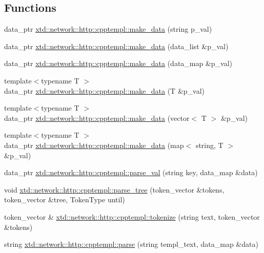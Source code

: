 \subsection*{Functions}
\begin{DoxyCompactItemize}
\item 
data\+\_\+ptr \hyperlink{namespacextd_1_1network_1_1http_1_1cpptempl_a32fe5ec0914372b09492647a168dbbcb}{xtd\+::network\+::http\+::cpptempl\+::make\+\_\+data} (string p\+\_\+val)
\item 
data\+\_\+ptr \hyperlink{namespacextd_1_1network_1_1http_1_1cpptempl_aae0780ff5e5b2afd5996fb6d27ff8ca0}{xtd\+::network\+::http\+::cpptempl\+::make\+\_\+data} (data\+\_\+list \&p\+\_\+val)
\item 
data\+\_\+ptr \hyperlink{namespacextd_1_1network_1_1http_1_1cpptempl_a4574c7173346efa3cfa420e5c657b58d}{xtd\+::network\+::http\+::cpptempl\+::make\+\_\+data} (data\+\_\+map \&p\+\_\+val)
\item 
{\footnotesize template$<$typename T $>$ }\\data\+\_\+ptr \hyperlink{namespacextd_1_1network_1_1http_1_1cpptempl_a290ac1d88dd4e0bcc65f955fb26e47c8}{xtd\+::network\+::http\+::cpptempl\+::make\+\_\+data} (T \&p\+\_\+val)
\item 
{\footnotesize template$<$typename T $>$ }\\data\+\_\+ptr \hyperlink{namespacextd_1_1network_1_1http_1_1cpptempl_af97e4f705fc7cb54a179fe88293b2bd7}{xtd\+::network\+::http\+::cpptempl\+::make\+\_\+data} (vector$<$ T $>$ \&p\+\_\+val)
\item 
{\footnotesize template$<$typename T $>$ }\\data\+\_\+ptr \hyperlink{namespacextd_1_1network_1_1http_1_1cpptempl_a9cfccbb6229825a04791ed3001f6500e}{xtd\+::network\+::http\+::cpptempl\+::make\+\_\+data} (map$<$ string, T $>$ \&p\+\_\+val)
\item 
data\+\_\+ptr \hyperlink{namespacextd_1_1network_1_1http_1_1cpptempl_af79d10d06cd5bc9ce629bb2d21fbcfd6}{xtd\+::network\+::http\+::cpptempl\+::parse\+\_\+val} (string key, data\+\_\+map \&data)
\item 
void \hyperlink{namespacextd_1_1network_1_1http_1_1cpptempl_a27515db5dde2876849fa316963a67e63}{xtd\+::network\+::http\+::cpptempl\+::parse\+\_\+tree} (token\+\_\+vector \&tokens, token\+\_\+vector \&tree, Token\+Type until)
\item 
token\+\_\+vector \& \hyperlink{namespacextd_1_1network_1_1http_1_1cpptempl_ab8c502f7e8347124c43f3dab3a583b34}{xtd\+::network\+::http\+::cpptempl\+::tokenize} (string text, token\+\_\+vector \&tokens)
\item 
string \hyperlink{namespacextd_1_1network_1_1http_1_1cpptempl_a10e259ee95bf5effff9095cdd140a058}{xtd\+::network\+::http\+::cpptempl\+::parse} (string templ\+\_\+text, data\+\_\+map \&data)
\end{DoxyCompactItemize}
